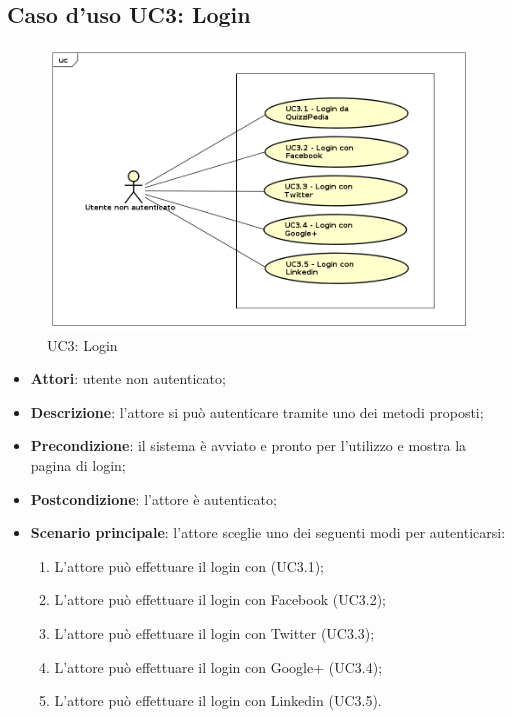 \newpage
\subsection{Caso d'uso UC3: Login}
\label{UC3}
\begin{figure}
	\centering
	\includegraphics[scale=0.5]{UML/UC3.png}
	\caption{UC3: Login}
\end{figure}
\FloatBarrier
\begin{itemize}
	\item \textbf{Attori}: utente non autenticato;
	\item \textbf{Descrizione}: l'attore si può autenticare tramite uno dei metodi proposti;
	\item \textbf{Precondizione}: il sistema è avviato e pronto per l'utilizzo e mostra la pagina di login;
	\item \textbf{Postcondizione}: l'attore è autenticato;
	\item \textbf{Scenario principale}: l'attore sceglie uno dei seguenti modi per autenticarsi:
		\begin{enumerate}
			\item L'attore può effettuare il login con \progetto (UC3.1);
			\item L'attore può effettuare il login con Facebook (UC3.2);
			\item L'attore può effettuare il login con Twitter (UC3.3);
			\item L'attore può effettuare il login con Google+ (UC3.4);
			\item L'attore può effettuare il login con Linkedin (UC3.5).
		\end{enumerate}
\end{itemize}

